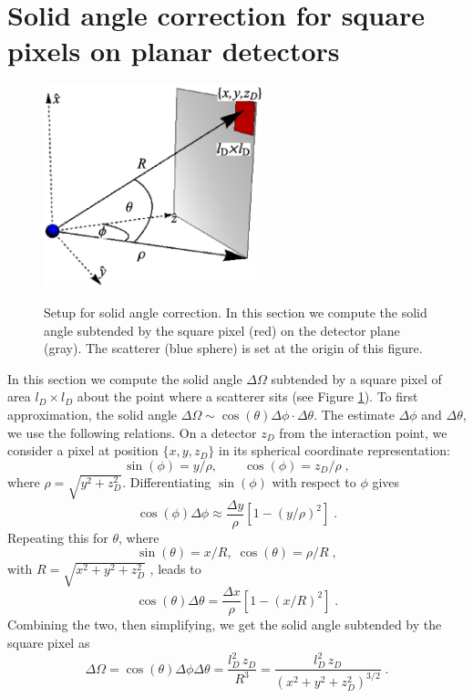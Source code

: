 \documentclass[preprint]{iucr}              %
\begin{document}
\section{Solid angle correction for square pixels on planar detectors}\label{sec:solidAngle}
\begin{figure}
\caption{Setup for solid angle correction. In this section we compute the solid angle subtended by the square pixel (red) on the detector plane (gray). The scatterer (blue sphere) is set at the origin of this figure.}
\includegraphics[width=2.5in]{figures/solidAngle.eps} \label{fig:solidAngle}
\end{figure}


In this section we compute the solid angle $\Delta \Omega$ subtended by a square pixel of area $l_D \times l_D$ about the point where a scatterer sits (see Figure \ref{fig:solidAngle}). To first approximation, the solid angle $\Delta \Omega \sim \cos(\theta) \Delta \phi \cdot \Delta \theta$. The estimate  $\Delta \phi$ and $\Delta \theta$, we use the following relations. On a detector $z_D$ from the interaction point, we consider a pixel at position $\{x,y,z_D\}$ in its spherical coordinate representation:
\begin{equation}
\sin (\phi) = y /\rho , \qquad \cos(\phi) = z_D / \rho \;,  
\end{equation}
where $\rho = \sqrt{y^2 + z_D^2}$.
Differentiating $\sin(\phi)$ with respect to $\phi$ gives
\begin{equation}
\cos(\phi) \Delta \phi \approx \frac{\Delta y}{\rho} \left[1 - \left( y/\rho\right)^2 \right]\;.
\end{equation}
Repeating this for $\theta$, where
\begin{equation}
\sin (\theta) = x /R ,\;  \cos(\theta) = \rho / R \;,
\end{equation}
with $R = \sqrt{x^2 + y^2 + z_D^2}$ , leads to 
\begin{equation}
\cos(\theta)\Delta \theta = \frac{\Delta x}{\rho} \left[ 1 - \left(x/R\right)^2\right] \;.
\end{equation}
Combining the two, then simplifying, we get the solid angle subtended by the square pixel as
\begin{equation}
\Delta \Omega = \cos(\theta) \Delta \phi \Delta \theta = \frac{l_D^2\, z_D}{R^3} =  \frac{l_D^2\, z_D}{\left( x^2 + y^2 + z_D^2\right)^{3/2}} \; .
\end{equation}
\end{document}
